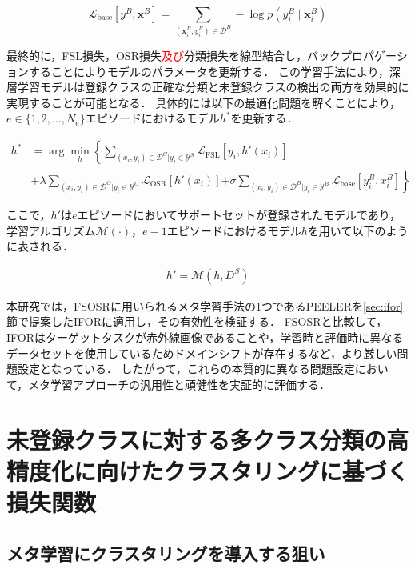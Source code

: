\documentclass[a4paper,11pt,nomag]{jsreport}
\begin{document}
\begin{equation}
  \mathcal{L}_{\mathrm{base}} [y^B, \bm{x}^B] = \sum_{(\bm{x}^B_i,y^B_i) \in \mathcal{D}^B} - \log {p(y^B_i \mid \bm{x}^B_i)}
\end{equation}

最終的に，FSL損失，OSR損失\textcolor{red}{及び}分類損失を線型結合し，バックプロパゲーションすることによりモデルのパラメータを更新する．
この学習手法により，深層学習モデルは登録クラスの正確な分類と未登録クラスの検出の両方を効果的に実現することが可能となる．
具体的には以下の最適化問題を解くことにより，$e \in \{1, 2, \ldots, N_e\}$エピソードにおけるモデル$h^*$を更新する．

\begin{align}
  h^* & = \arg \min_h \left\{ \sum_{(x_i,y_i) \in \mathcal{D}^C|y_i \in \mathcal{Y}^S}{\mathcal{L}_{\mathrm{FSL}}[y_i,h'(x_i)]} \right. \nonumber \\
      & + \lambda \sum_{(x_i,y_i) \in \mathcal{D}^O|y_i \in \mathcal{Y}^O}{\mathcal{L}_{\mathrm{OSR}}[h'(x_i)]}
        \left. + \sigma \sum_{(x_i,y_i) \in \mathcal{D}^B|y_i \in \mathcal{Y}^B}{\mathcal{L}_{\mathrm{base}}[y^B_i,x^B_i]} \right\}
\end{align}

\noindent
ここで，$h'$は$e$エピソードにおいてサポートセットが登録されたモデルであり，
学習アルゴリズム$\mathcal{M}(\cdot)$，$e-1$エピソードにおけるモデル$h$を用いて以下のように表される．

\begin{align}
  h' = \mathcal{M}(h, D^S)
\end{align}

本研究では，FSOSRに用いられるメタ学習手法の1つであるPEELERを\ref{sec:ifor}節で提案したIFORに適用し，その有効性を検証する．
FSOSRと比較して，IFORはターゲットタスクが赤外線画像であることや，学習時と評価時に異なるデータセットを使用しているためドメインシフトが存在するなど，より厳しい問題設定となっている．
したがって，これらの本質的に異なる問題設定において，メタ学習アプローチの汎用性と頑健性を実証的に評価する．

\section{未登録クラスに対する多クラス分類の高精度化に向けたクラスタリングに基づく損失関数}

\subsection{メタ学習にクラスタリングを導入する狙い}
\label{subsec:purpose}
\end{document}
